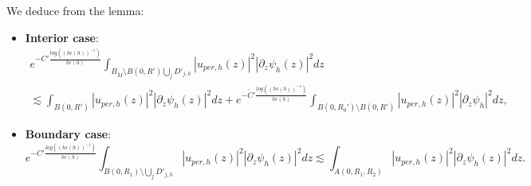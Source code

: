 \documentclass[leqno,11pt,letterpaper, english]{amsart}
\theoremstyle{plain}
\theoremstyle{definition}
\numberwithin{equation}{section}
\begin{document}

We deduce from the lemma:
\begin{itemize}
\item \textbf{Interior case}:
	\begin{multline}
		e^{-C' \frac{log((h\epsilon(h))^{-1})}{h\epsilon(h)}}\int_{B_{ \tilde{M}}\setminus B(0,R')\bigcup_j D'_{j,h}} \left| u_{per,h}(z)\right|^2 \left| \partial_z \psi_h\left(z\right)\right|^2 dz \\   
		\lesssim \int_{B(0,R')} \left|u_{per,h}(z)\right|^2\left|\partial_z \psi_h\left(z\right)\right|^2dz+e^{-\tilde{C}' \frac{log((h\epsilon(h))^{-1})}{h\epsilon(h)}}\int_{B(0,R_0')\setminus B(0,R')}|u_{per,h}(z)|^2\left|\partial_z \psi_h\right|^2dz,
	\end{multline}
\item \textbf{Boundary case}:
	\begin{equation}
		e^{-C' \frac{log((h\epsilon(h))^{-1})}{h\epsilon(h)}}\int_{B(0,R_1)\setminus \bigcup_j D'_{j,h}} \left| u_{per,h}(z)\right|^2 \left| \partial_z \psi_h\left(z\right)\right|^2 dz  
		\lesssim \int_{A(0,R_1,R_2)} \left|u_{per,h}(z)\right|^2\left|\partial_z \psi_h\left(z\right)\right|^2dz.
	\end{equation}
\end{itemize}
\end{document}
